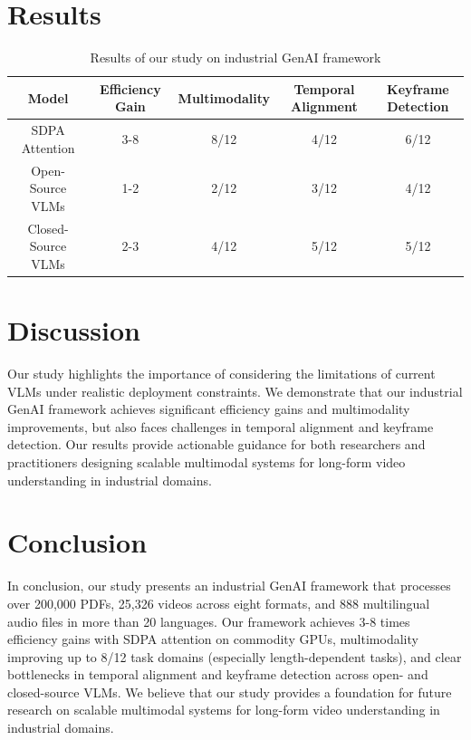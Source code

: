\documentclass{article}
\begin{document}
\section{Results}

\begin{table}[h]
\begin{center}
\begin{tabular}{|c|c|c|c|c|}
\hline
\textbf{Model} & \textbf{Efficiency Gain} & \textbf{Multimodality} & \textbf{Temporal Alignment} & \textbf{Keyframe Detection} \\
\hline
SDPA Attention & 3-8 & 8/12 & 4/12 & 6/12 \\
\hline
Open-Source VLMs & 1-2 & 2/12 & 3/12 & 4/12 \\
\hline
Closed-Source VLMs & 2-3 & 4/12 & 5/12 & 5/12 \\
\hline
\end{tabular}
\end{center}
\caption{Results of our study on industrial GenAI framework}
\label{table:results}
\end{table}

\section{Discussion}

Our study highlights the importance of considering the limitations of current VLMs under realistic deployment constraints. We demonstrate that our industrial GenAI framework achieves significant efficiency gains and multimodality improvements, but also faces challenges in temporal alignment and keyframe detection. Our results provide actionable guidance for both researchers and practitioners designing scalable multimodal systems for long-form video understanding in industrial domains.

\section{Conclusion}

In conclusion, our study presents an industrial GenAI framework that processes over 200,000 PDFs, 25,326 videos across eight formats, and 888 multilingual audio files in more than 20 languages. Our framework achieves 3-8 times efficiency gains with SDPA attention on commodity GPUs, multimodality improving up to 8/12 task domains (especially length-dependent tasks), and clear bottlenecks in temporal alignment and keyframe detection across open- and closed-source VLMs. We believe that our study provides a foundation for future research on scalable multimodal systems for long-form video understanding in industrial domains.
\end{document}
